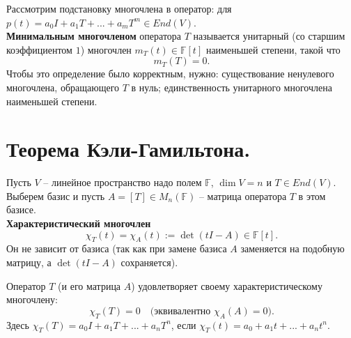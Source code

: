 \documentclass[14pt]{extreport}
\begin{document}
    \begin{defbox}
        Рассмотрим подстановку многочлена в оператор: для $p(t) = a_0I + a_1T + ... + a_mT^m \in End(V)$.\\
        \textbf{Минимальным многочленом} оператора $T$ называется унитарный (со старшим коэффициентом $1$) многочлен $m_T(t) \in \mathbb{F}[t]$ наименьшей степени, такой что
        \[
        m_T(T) = 0.
        \]
        Чтобы это определение было корректным, нужно: существование ненулевого многочлена, обращающего $T$ в нуль; единственность унитарного многочлена наименьшей степени.
    \end{defbox}



    \chapter{Теорема Кэли-Гамильтона.}

    \begin{defbox}
        Пусть $V$ – линейное пространство надо полем $\mathbb{F}$, $\dim V = n$ и $T \in End(V)$. Выберем базис и пусть $A = [T] \in M_n(\mathbb{F})$ – матрица оператора $T$ в этом базисе.\\
        \textbf{Характеристический многочлен}
        \[
        \chi_T(t) = \chi_A(t) := \det(tI-A) \in \mathbb{F}[t].
        \]
        Он не зависит от базиса (так как при замене базиса $A$ заменяется на подобную матрицу, а $\det(tI-A)$ сохраняется).
    \end{defbox}

    \begin{thbox}
        Оператор $T$ (и его матрица $A$) удовлетворяет своему характеристическому многочлену:
        \[
        \chi_T(T) = 0 \quad \text{(эквивалентно $\chi_A(A)=0$).}
        \]
        Здесь $\chi_T(T) = a_0I + a_1T + ... + a_nT^n$, если $\chi_T(t) = a_0 + a_1t + ... + a_nt^n$.
    \end{thbox}
\end{document}
